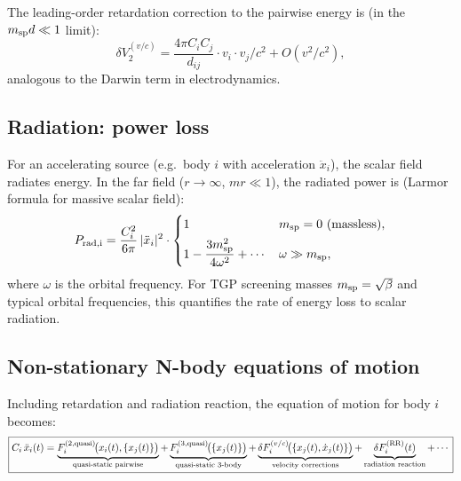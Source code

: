 The leading-order retardation correction to the pairwise energy is (in the
$m_{\rm sp} d\ll 1$ limit):
\begin{equation}
\delta V_2^{(v/c)}
= \frac{4\pi C_i C_j}{d_{ij}}\cdot v_i \cdot v_j / c^2 + O(v^2/c^2),
\end{equation}
analogous to the Darwin term in electrodynamics.

\subsection{Radiation: power loss}

For an accelerating source (e.g.\ body $i$ with acceleration $\ddot x_i$),
the scalar field radiates energy.  In the far field ($r\to\infty$, $m r\ll 1$),
the radiated power is (Larmor formula for massive scalar field):
\begin{equation}
P_{\rm rad,i}
= \frac{C_i^2}{6\pi}\,|\ddot x_i|^2
  \cdot
  \begin{cases}
    1 & m_{\rm sp}=0\text{ (massless)},\\[4pt]
    \displaystyle
    1 - \frac{3m_{\rm sp}^2}{4\omega^2}+\cdots & \omega \gg m_{\rm sp},
  \end{cases}
\end{equation}
where $\omega$ is the orbital frequency.  For TGP screening masses
$m_{\rm sp} = \sqrt{\beta}$ and typical orbital frequencies,
this quantifies the rate of energy loss to scalar radiation.

\subsection{Non-stationary N-body equations of motion}

Including retardation and radiation reaction, the equation of motion for
body $i$ becomes:
\begin{equation}
\boxed{
C_i\,\ddot x_i(t)
=
\underbrace{
F_i^{(2,\rm quasi)}\!\bigl(x_i(t),\{x_j(t)\}\bigr)
}_{\text{quasi-static pairwise}}
+
\underbrace{
F_i^{(3,\rm quasi)}\!\bigl(\{x_j(t)\}\bigr)
}_{\text{quasi-static 3-body}}
+
\underbrace{
\delta F_i^{(v/c)}\!\bigl(\{x_j(t),\dot x_j(t)\}\bigr)
}_{\text{velocity corrections}}
+
\underbrace{
\delta F_i^{(\rm RR)}(t)
}_{\text{radiation reaction}}
+
\cdots
}
\label{eq:eom_nonstationary}
\end{equation}


